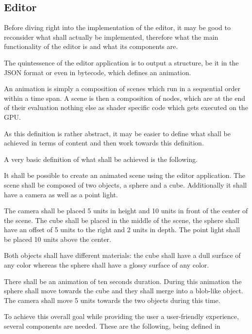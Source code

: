 \documentclass[
    a4paper,      %
    10pt,         %
    openright,    %
    notitlepage,  %
    parskip=half, %
]{scrreprt}       %
\theoremstyle{definition}                    %
\begin{document}
\subsection{Editor}
\label{subsec:editor}

Before diving right into the implementation of the editor, it may be good to
reconsider what shall actually be implemented, therefore what the main
functionality of the editor is and what its components are.

The quintessence of the editor application is to output a structure, be it in
the JSON format or even in bytecode, which defines an animation.

An animation is simply a composition of scenes which run in a sequential order
within a time span. A scene is then a composition of nodes, which are at the end
of their evaluation nothing else as shader specific code which gets executed on
the GPU.

As this definition is rather abstract, it may be easier to define what shall be
achieved in terms of content and then work towards this definition.

A very basic definition of what shall be achieved is the following.

It shall be possible to create an animated scene using the editor application.
The scene shall be composed of two objects, a sphere and a cube. Additionally it
shall have a camera as well as a point light.

The camera shall be placed 5 units in height and 10 units in front of the center
of the scene. The cube shall be placed in the middle of the scene, the sphere
shall have an offset of 5 units to the right and 2 units in depth. The point
light shall be placed 10 units above the center.

Both objects shall have different materials: the cube shall have a dull surface
of any color whereas the sphere shall have a glossy surface of any color.

There shall be an animation of ten seconds duration. During this animation the
sphere shall move towards the cube and they shall merge into a blob-like object.
The camera shall move 5 units towards the two objects during this time.


To achieve this overall goal while providing the user a user-friendly
experience, several components are needed. These are the following, being
defined in~
\end{document}

